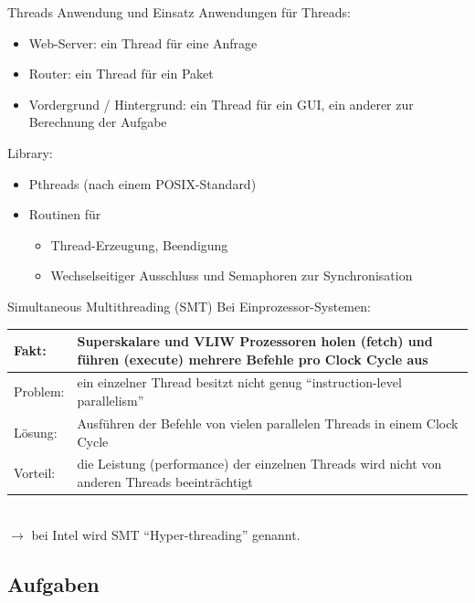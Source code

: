 \begin{example}{Threads Anwendung und Einsatz}
    Anwendungen für Threads:
    \begin{itemize}
        \item Web-Server: ein Thread für eine Anfrage
        \item Router: ein Thread für ein Paket
        \item Vordergrund / Hintergrund: ein Thread für ein GUI,
              ein anderer zur Berechnung der Aufgabe
    \end{itemize}
    Library:
    \begin{itemize}
        \item Pthreads (nach einem POSIX-Standard)
        \item Routinen für
              \begin{itemize}
                  \item Thread-Erzeugung, Beendigung
                  \item Wechselseitiger Ausschluss und Semaphoren zur Synchronisation
              \end{itemize}
    \end{itemize}
\end{example}

\begin{defi}[Threads]{Simultaneous Multithreading (SMT)}
    Bei Einprozessor-Systemen: \\
    \begin{tabularx}{\textwidth}{|l|X|}
        \hline
        Fakt:    & Superskalare und VLIW Prozessoren holen (fetch) und führen (execute) mehrere Befehle pro Clock Cycle aus \\
        \hline
        Problem: & ein einzelner Thread besitzt nicht genug \enquote{instruction-level parallelism}                         \\
        \hline
        Lösung:  & Ausführen der Befehle von vielen parallelen Threads in einem Clock Cycle                                 \\
        \hline
        Vorteil: & die Leistung (performance) der einzelnen Threads wird nicht von anderen Threads beeinträchtigt           \\
        \hline
    \end{tabularx}
    \\
    $\to$ bei Intel wird SMT \enquote{Hyper-threading} genannt.
\end{defi}

\subsection{Aufgaben}

